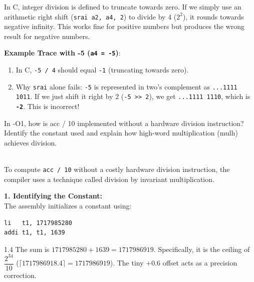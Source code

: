 \documentclass[12pt, a4paper]{article}
\begin{document}
In C, integer division is defined to truncate towards zero. If we simply use an arithmetic right shift (\texttt{srai a2, a4, 2}) to divide by 4 ($2^2$), it rounds towards negative infinity. This works fine for positive numbers but produces the wrong result for negative numbers.

\noindent
\textbf{Example Trace with -5 (\texttt{a4 = -5})}:
\begin{enumerate}[leftmargin=*]
    \item In C, \texttt{-5 / 4} should equal \texttt{-1} (truncating towards zero).
    \item Why \texttt{srai} alone fails: \texttt{-5} is represented in two's complement as \texttt{...1111 1011}. If we just shift it right by 2 (\texttt{-5 >> 2}), we get \texttt{...1111 1110}, which is \textbf{\texttt{-2}}. This is incorrect!
\end{enumerate}

\noindent\hrulefill

\vspace{0.3cm}
\noindent
In -O1, how is acc / 10 implemented without a hardware division instruction?
Identify the constant used and explain how high-word multiplication (mulh) achieves
division.

\vspace{0.3cm}
\noindent{}\\
To compute \texttt{acc / 10} without a costly hardware division instruction, the compiler uses a technique called division by invariant multiplication.

\noindent
\textbf{1. Identifying the Constant:}\\
The assembly initializes a constant using:
\begin{verbatim}
li   t1, 1717985280
addi t1, t1, 1639
\end{verbatim}
\begin{spacing}{1.4}
The sum is $1717985280 + 1639 = 1717986919$. Specifically, it is the ceiling of $\dfrac{2^{34}}{10}$ ($\lceil 1717986918.4 \rceil = 1717986919$). The tiny $+0.6$ offset acts as a precision correction.
\end{spacing}
\end{document}
